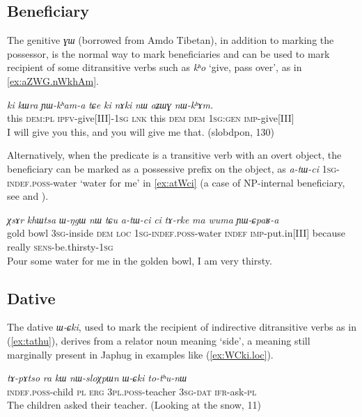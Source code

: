 \documentclass[oneside,a4paper,11pt]{article}
\newcommand{\ipa}[1]{\mbox{\phon\textit{#1}}} %
\begin{document}
 \subsection{Beneficiary}  \label{sec:benef}
The genitive \ipa{ɣɯ} (borrowed from Amdo Tibetan), in addition to marking the possessor, is the normal way to mark beneficiaries and can be used to mark recipient of some ditransitive verbs such as \ipa{kʰo} `give, pass over', as in \ref{ex:aZWG.nWkhAm}.

\begin{exe}
\ex \label{ex:aZWG.nWkhAm}
\gll
\ipa{ki} 	\ipa{kɯra} 	\ipa{ɲɯ-kʰam-a} 	\ipa{tɕe} 	\ipa{ki} 	\ipa{nɤki} 	\ipa{nɯ} 	\ipa{aʑɯɣ} 	\ipa{nɯ-kʰɤm.} \\
this \textsc{dem:pl} \textsc{ipfv}-give[III]-\textsc{1sg} \textsc{lnk} this \textsc{dem} \textsc{dem} \textsc{1sg:gen} \textsc{imp}-give[III] \\
\glt I will give you this, and you will give me that. (slobdpon, 130)
\end{exe}

Alternatively, when the predicate is a transitive verb with an overt object, the beneficiary can be marked as a possessive prefix on the object, as 	\ipa{a-tɯ-ci} \textsc{1sg-indef.poss}-water `water for me' in \ref{ex:atWci} (a case of NP-internal  beneficiary, see \citealt[80]{lehmann04partizipation} and \citealt[15]{malchukov10ditransitive}).

\begin{exe}
\ex \label{ex:atWci}
\gll \ipa{χsɤr}  	\ipa{khɯtsa}  	\ipa{ɯ-ŋgɯ}  	\ipa{nɯ}  	\ipa{tɕu}  	\ipa{a-tɯ-ci}  	\ipa{ci}  	\ipa{tɤ-rke}  	\ipa{ma}  	\ipa{wuma}  	\ipa{ɲɯ-ɕpaʁ-a}  \\
gold bowl \textsc{3sg}-inside \textsc{dem} \textsc{loc} \textsc{1sg-indef.poss}-water \textsc{indef} \textsc{imp}-put.in[III] because really \textsc{sens}-be.thirsty-\textsc{1sg} \\
\glt Pour some water for me in the golden bowl, I am very thirsty.
\end{exe}
 

\subsection{Dative}  \label{sec:dat}
The dative \ipa{ɯ-ɕki}, used to mark the recipient of indirective ditransitive verbs as in (\ref{ex:tathu}), derives from a relator noun  meaning `side', a meaning still marginally present in Japhug in examples like (\ref{ex:WCki.loc}).

 \begin{exe}
   \ex   \label{ex:tathu}
 \gll \ipa{tɤ-pɤtso}  	\ipa{ra}  	\ipa{kɯ}  	\ipa{nɯ-sloχpɯn}  	\ipa{ɯ-ɕki}  	\ipa{to-tʰu-nɯ}  \\
\textsc{indef.poss}-child \textsc{pl} \textsc{erg} \textsc{3pl.poss}-teacher \textsc{3sg-dat} \textsc{ifr}-ask-\textsc{pl} \\
\glt The children asked their teacher. (Looking at the snow, 11)
   \end{exe}  
\end{document}

